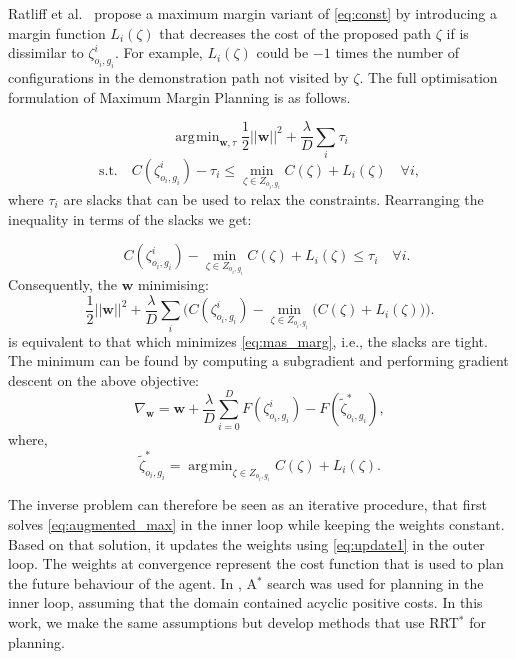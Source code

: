 \documentclass[a4paper,11pt]{report}
\DeclareMathOperator*{\argmin}{\arg\!\min}
\begin{document}
Ratliff et al.\ \cite{ratliff2006maximum} propose a maximum margin variant of \eqref{eq:const} by introducing a margin function $L_i(\zeta)$ that decreases the cost of the proposed path $\zeta$ if is dissimilar to $\zeta^i_{o_i,g_i}$. For example, $L_i(\zeta)$ could be $-1$ times the number of configurations in the demonstration path not visited by $\zeta$. The full optimisation formulation of Maximum Margin Planning is as follows.

\begin{equation}
	\argmin_{\mathbf{w},\tau} \frac{1}{2}||\mathbf{w}||^2 + \frac{\lambda}{D} \sum_i \tau_i \label{eq:mas_marg}
\end{equation}
\begin{equation}
	\text{s.t.} \quad C(\zeta^i_{o_i,g_i}) - \tau_i \leq \min_{\zeta \in Z_{o_i,g_i}} C(\zeta) + L_i(\zeta) \quad \forall i,
\end{equation}
where $\tau_i$ are slacks that can be used to relax the constraints. Rearranging the inequality in terms of the slacks we get:

\begin{equation}
	 \quad C(\zeta^i_{o_i,g_i}) - \min_{\zeta \in Z_{o_i,g_i}} C(\zeta) + L_i(\zeta)  \leq \tau_i  \quad \forall i.
\end{equation}
Consequently, the $\mathbf{w}$ minimising:
\begin{equation}
	\frac{1}{2}||\mathbf{w}||^2 + \frac{\lambda}{D} \sum_i \big( C(\zeta^i_{o_i,g_i}) - \min_{\zeta \in Z_{o_i,g_i}}\big(C(\zeta) + L_i(\zeta)\big) \big) \big. \label{eq:unconstrained}
\end{equation}
is equivalent to that which minimizes \eqref{eq:mas_marg}, i.e., the slacks are tight.
The minimum can be found by computing a subgradient and performing gradient descent on the above objective:
\begin{equation}
	\nabla_{\mathbf{w}} =\mathbf{w} +  \frac{\lambda}{D} \sum_{i=0}^D F(\zeta^i_{o_i,g_i}) - F(\tilde{\zeta}^*_{o_i,g_i}), \label{eq:update1}
\end{equation}
where,
\begin{equation}
	\tilde{\zeta}^*_{o_i,g_i} = \argmin_{\zeta \in Z_{o_i,g_i}} C(\zeta) + L_i(\zeta). \label{eq:augmented_max}
\end{equation}

The inverse problem can therefore be seen as an iterative procedure, that first solves \eqref{eq:augmented_max} in the inner loop while keeping the weights constant. Based on that solution, it updates the weights using \eqref{eq:update1} in the outer loop. The weights at convergence represent the cost function that is used to plan the future behaviour of the agent. In \cite{ratliff2006maximum}, A$^*$ search was used for planning in the inner loop, assuming that the domain contained acyclic positive costs. In this work, we make the same assumptions but develop methods that use RRT$^*$ for planning.
\end{document}
